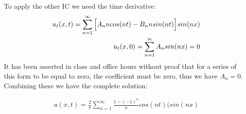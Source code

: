 \documentclass{article}
\begin{document}
To apply the other IC we need the time derivative:
\begin{equation}
\begin{aligned}
u_t(x,t) = \sum_{n=1}^{\infty}\Big{[}A_nncos(nt) - B_nnsin(nt)\Big{]}sin(nx)\\
u_t(x,0) =\sum_{n=1}^{\infty} A_nsin(nx) = 0
\end{aligned}
\end{equation}
It has been asserted in class and office hours without proof that for a series of this form to be equal to zero, the coefficient must be zero, thus we have $A_n = 0$. Combining these we have the complete solution:
\begin{tcolorbox}[minipage,colback=white,arc=0pt,outer arc=0pt]
\begin{equation}
\begin{aligned}
u(x,t) = \frac{2}{\pi}\sum_{n=1}^{\infty}\frac{1 -(-1)^n}{n}cos(nt)(sin(nx)
\end{aligned}
\end{equation}
\end{tcolorbox}
\end{document}
